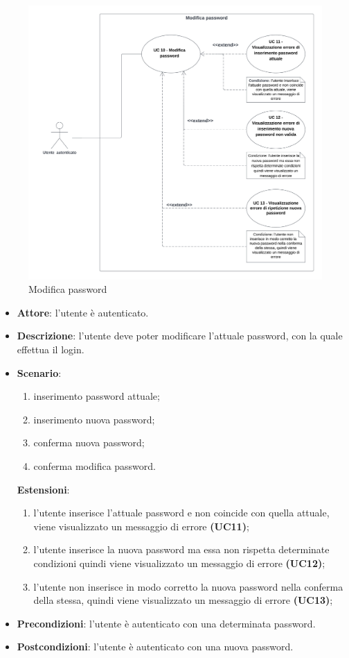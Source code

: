 \begin{figure}[H]
    \includegraphics[width=15cm]{sezioni/Images/UC10.png}
    \centering
    \caption{Modifica password}
\end{figure}

\begin{itemize}
    \item \textbf{Attore}: l'utente è autenticato.
    \item \textbf{Descrizione}: l'utente deve poter modificare l'attuale password, con la quale effettua il login.
    \item \textbf{Scenario}:
    \begin{enumerate}
        \item inserimento password attuale;
        \item inserimento nuova password;
        \item conferma nuova password;
        \item conferma modifica password.
    \end{enumerate}
    \textbf{Estensioni}:
    \begin{enumerate}
        \item l'utente inserisce l'attuale password e non coincide con quella attuale, viene visualizzato un messaggio di errore \textbf{(UC11)};
        \item l'utente inserisce la nuova password ma essa non rispetta determinate condizioni quindi viene visualizzato un messaggio di errore \textbf{(UC12)};
        \item l'utente non inserisce in modo corretto la nuova password nella conferma della stessa, quindi viene visualizzato un messaggio di errore \textbf{(UC13)};
    \end{enumerate}

    \item \textbf{Precondizioni}: l'utente è autenticato con una determinata password.
    \item \textbf{Postcondizioni}: l'utente è autenticato con una nuova password.
\end{itemize}

